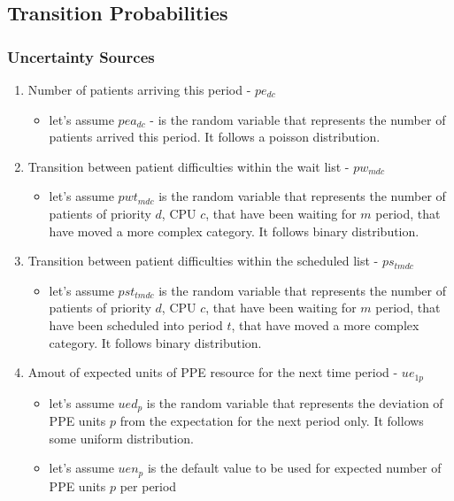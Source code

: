 \documentclass{article}
\begin{document}
\subsection{Transition Probabilities}

\subsubsection{Uncertainty Sources}
\begin{enumerate}
    	
	\item Number of patients arriving this period - $pe_{dc}$
		\begin{itemize}
			\item let's assume $pea_{dc}$ - is the random variable that represents the number of patients arrived this period. It follows a poisson distribution.
		\end{itemize}
	
	\item Transition between patient difficulties within the wait list - $pw_{mdc}$
		\begin{itemize}
			\item let's assume $pwt_{mdc}$ is the random variable that represents the number of patients of priority $d$, CPU $c$, that have been waiting for $m$ period, that have moved a more complex category. It follows binary distribution.
		\end{itemize}
		
	\item Transition between patient difficulties within the scheduled list - $ps_{tmdc}$
		\begin{itemize}
			\item let's assume $pst_{tmdc}$ is the random variable that represents the number of patients of priority $d$, CPU $c$, that have been waiting for $m$ period, that have been scheduled into period $t$, that have moved a more complex category. It follows binary distribution.
		\end{itemize}

	\item Amout of expected units of PPE resource for the next time period - $ue_{1p}$
		\begin{itemize}
			\item let's assume $ued_{p}$ is the random variable that represents the deviation of PPE units $p$ from the expectation for the next period only. It follows some uniform distribution.
			\item let's assume $uen_{p}$ is the default value to be used for expected number of PPE units $p$ per period
		\end{itemize}
\end{enumerate}
\end{document}

